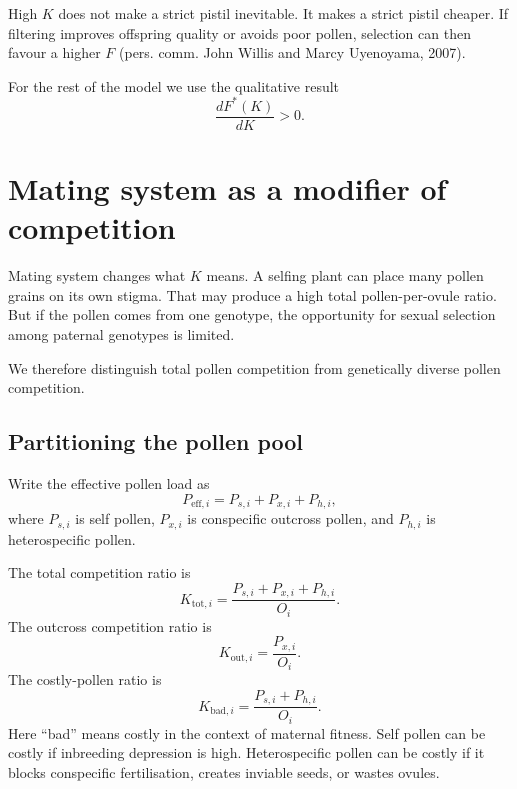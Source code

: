 \documentclass[12pt]{article}
\begin{document}
\begin{conclusionbox}
High $K$ does not make a strict pistil inevitable. It makes a strict pistil cheaper. If filtering improves offspring quality or avoids poor pollen, selection can then favour a higher $F$ (pers. comm. John Willis and Marcy Uyenoyama, 2007).
\end{conclusionbox}

For the rest of the model we use the qualitative result
\begin{equation}
\frac{dF^*(K)}{dK}>0.
\label{eq:dFdK}
\end{equation}

\section{Mating system as a modifier of competition}

Mating system changes what $K$ means. A selfing plant can place many pollen grains on its own stigma. That may produce a high total pollen-per-ovule ratio. But if the pollen comes from one genotype, the opportunity for sexual selection among paternal genotypes is limited.

We therefore distinguish total pollen competition from genetically diverse pollen competition.

\subsection{Partitioning the pollen pool}

Write the effective pollen load as
\begin{equation}
P_{\mathrm{eff},i}=P_{s,i}+P_{x,i}+P_{h,i},
\label{eq:pollenpartition}
\end{equation}
where $P_{s,i}$ is self pollen, $P_{x,i}$ is conspecific outcross pollen, and $P_{h,i}$ is heterospecific pollen.

The total competition ratio is
\begin{equation}
K_{\mathrm{tot},i}=\frac{P_{s,i}+P_{x,i}+P_{h,i}}{O_i}.
\label{eq:Ktot}
\end{equation}
The outcross competition ratio is
\begin{equation}
K_{\mathrm{out},i}=\frac{P_{x,i}}{O_i}.
\label{eq:Kout}
\end{equation}
The costly-pollen ratio is
\begin{equation}
K_{\mathrm{bad},i}=\frac{P_{s,i}+P_{h,i}}{O_i}.
\label{eq:Kbad}
\end{equation}
Here ``bad'' means costly in the context of maternal fitness. Self pollen can be costly if inbreeding depression is high. Heterospecific pollen can be costly if it blocks conspecific fertilisation, creates inviable seeds, or wastes ovules.
\end{document}
